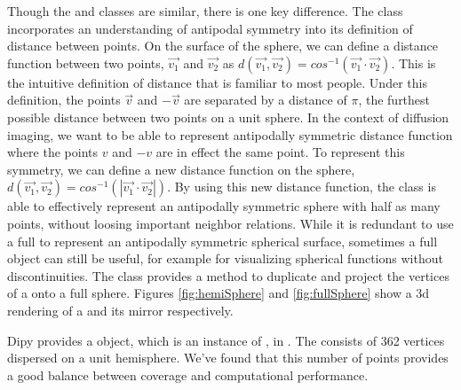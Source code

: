 Though the  and  classes are similar, there is one key difference. The  class incorporates an understanding of antipodal symmetry into its definition of distance between points. On the surface of the sphere, we can define a distance function between two points, $\vec{v_1}$ and $\vec{v_2}$ as $d(\vec{v_1}, \vec{v_2}) = cos^{-1}(\vec{v_1} \cdot \vec{v_2})$. This is the intuitive definition of distance that is familiar to most people. Under this definition, the points $\vec{v}$ and $-\vec{v}$ are separated by a distance of $\pi$, the furthest possible distance between two points on a unit sphere. In the context of diffusion imaging, we want to be able to represent antipodally symmetric distance function where the points $v$ and $-v$ are in effect the same point. To represent this symmetry, we can define a new distance function on the sphere, $d(\vec{v_1}, \vec{v_2}) = cos^{-1}(|\vec{v_1} \cdot \vec{v_2}|)$. By using this new distance function, the  class is able to effectively represent an antipodally symmetric sphere with half as many points, without loosing important neighbor relations. While it is redundant to use a full  to represent an antipodally symmetric spherical surface, sometimes a full  object can still be useful, for example for visualizing spherical functions without discontinuities. The  class provides a  method to duplicate and project the vertices of a  onto a full sphere. Figures \ref{fig:hemiSphere} and \ref{fig:fullSphere} show a 3d rendering of a  and its mirror respectively.

Dipy provides a  object, which is an instance of , in . The  consists of 362 vertices dispersed on a unit hemisphere. We've found that this number of points provides a good balance between coverage and computational performance.
